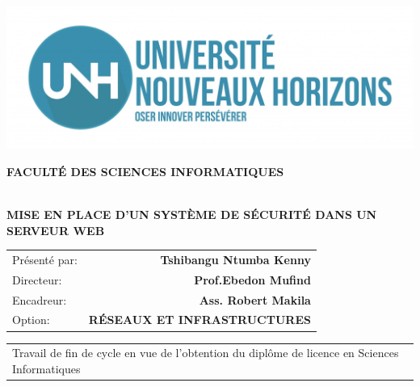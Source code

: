 \begin{center}
	\includegraphics[scale=0.15]{PhotoMemoire/Logo.jpg}
\end{center}

\begin{center}
	\textbf{\large FACULTÉ DES SCIENCES INFORMATIQUES}
\end{center}


\vspace{3cm}
\begin{center}
	\hrulefill \\
	\large{
		\textbf{
			 MISE EN PLACE D'UN SYSTÈME DE SÉCURITÉ DANS UN SERVEUR WEB	
		}
	} \\
	\hrulefill
\end{center}


\vspace{0.5cm}
\hfill
\begin{tabular}{lr}
	Présenté par: & \textbf{Tshibangu Ntumba Kenny} \\
	Directeur: & \textbf{Prof.Ebedon Mufind} \\
	Encadreur: & \textbf{Ass. Robert Makila} \\
	Option: & \textbf{RÉSEAUX ET INFRASTRUCTURES}
\end{tabular}

\vspace{0.5cm}
\hfill
\begin{tabular}{p{9.5cm}}
	Travail de fin de cycle en vue de l'obtention du diplôme de licence en Sciences Informatiques
\end{tabular}

